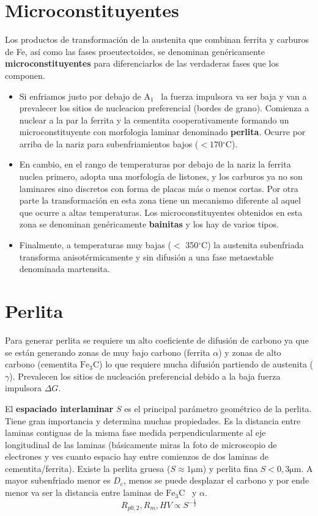 \documentclass{article}
\newcommand{\Aone}{A\ensuremath{_{1}}}
\newcommand{\grad}{\ensuremath{^\circ \mathrm{C}}}
\newcommand{\cementita}{\ensuremath{\mathrm{Fe}_3 \mathrm{C}}}
\begin{document}
\section{Microconstituyentes}
Los productos de transformación de la austenita que combinan
ferrita y carburos de Fe, así como las fases proeutectoides, se denominan genéricamente \textbf{microconstituyentes} para diferenciarlos de las verdaderas fases que los componen.
\begin{itemize}
    \item Si enfriamos justo por debajo de \Aone~ la fuerza impulsora va ser baja  y van a prevalecer los sitios de nucleacion preferencial (bordes de grano). Comienza a nuclear a la par la ferrita y la cementita cooperativamente formando un microconstituyente con morfologia laminar denominado \textbf{perlita}. Ocurre por arriba de la nariz para subenfriamientos bajos ($<170\grad$).
    \item En cambio, en el rango de temperaturas por debajo de la nariz la ferrita nuclea primero, adopta una morfología de listones, y los carburos ya no son laminares sino discretos con forma de placas más o menos cortas. Por otra parte la transformación en esta zona tiene un mecanismo diferente al aquel que ocurre a altas temperaturas. Los microconstituyentes obtenidos en esta zona se denominan genéricamente \textbf{bainitas} y los hay de varios tipos.
    \item Finalmente, a temperaturas muy bajas ($<$ 350\grad) la austenita subenfriada transforma anisotérmicamente y sin difusión a una fase metaestable denominada martensita.
\end{itemize}


\section{Perlita}
Para generar perlita se requiere un alto coeficiente de difusión de carbono ya que se están generando zonas de muy bajo carbono (ferrita $\alpha$) y zonas de alto carbono (cementita $\cementita$) lo que requiere mucha difusión partiendo de austenita ($\gamma$). Prevalecen los sitios de nucleación preferencial debido a la baja fuerza impulsora $\Delta G$.

El \textbf{espaciado interlaminar} $S$ es el principal parámetro geométrico de la perlita. Tiene gran importancia y determina muchas propiedades. Es la distancia entre laminas contiguas de la misma fase medida perpendicularmente al eje longitudinal de las laminas (básicamente miras la foto de microscopio de electrones y ves cuanto espacio hay entre comienzos de dos laminas de cementita/ferrita). Existe la perlita gruesa ($S\approx 1\si{\micro \meter}$) y perlita fina $S< 0,3\si{\micro \meter}$. A mayor subenfriado menor es $D_c$, menos se puede desplazar el carbono y por ende menor va ser la distancia entre laminas de \cementita~ y $\alpha$.
\begin{equation}\label{eq:StoPerliteStrength}
    R_{p 0,2}, R_{m}, H V \propto S^{-\frac{1}{2}}
\end{equation}
\end{document}
